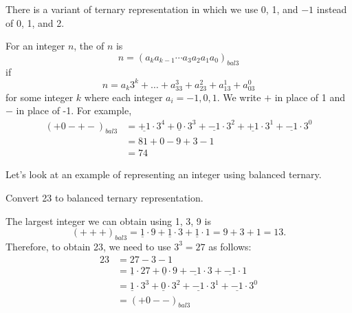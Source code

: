 There is a variant of ternary representation in which we use 0, 1, and $-1$ instead of 0, 1, and 2.

\begin{defn}
\label{defn_bal_tern_rep}
    For an integer $n$, the  of $n$ is
            $$n = \left(a_ka_{k-1}\cdots a_3a_2a_1a_0\right)_{bal3}$$
        if $$n=a_k3^k + \dots + a_33^ 3+a_23^2+a_13^1+a_03^0$$ 
        for some integer $k$ where each integer $a_i = -1,0,1$.  We write $+$ in place of 1 and $-$ in place of -1.  For example, 
            \begin{align*}
                (+0-+-)_{bal3} & =\underline{+1}\cdot 3^4 +\underline{0}\cdot 3^3 +\underline{-1}\cdot 3^2 +\underline{+1}\cdot 3^1 +\underline{-1}\cdot 3^0 \\
                & = 81+0-9+3-1 \\
                & = 74
            \end{align*}
\end{defn}

Let's look at an example of representing an integer using balanced ternary.

\begin{exam}
\label{exam_bal_tern_rep}
    Convert 23 to balanced ternary representation.
        \begin{soln}
            The largest integer we can obtain using 1, 3, 9 is 
                $$(+++)_{bal3} 
                = \underline{1}\cdot 9 + \underline{1}\cdot 3 + \underline{1} \cdot 1
                =9+3+1=13.$$
            Therefore, to obtain 23, we need to use $3^3 = 27$ as follows: 
                \begin{align*}
                    23 & = 27 - 3 - 1 \\
                    & = \underline{1}\cdot 27 + \underline{0} \cdot 9 + \underline{-1} \cdot 3 +  \underline{-1} \cdot 1 \\
                    & = \underline{1}\cdot 3^3 + \underline{0} \cdot 3^2 + \underline{-1} \cdot 3^1 +  \underline{-1} \cdot 3^0 \\
                    & = (+0--)_{bal3}
                \end{align*}
        \end{soln}
\end{exam}


\newcommand{\subbinary}{Binary  Representation}
